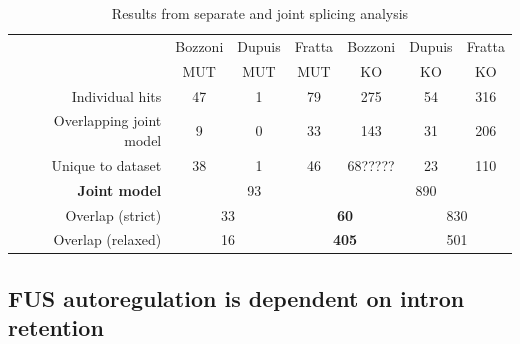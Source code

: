 \begingroup
\renewcommand{\arraystretch}{1.5} 
\begin{table}[h!]
		\begin{tabular}{|r|ccc|ccc|}
			\hline
			& Bozzoni & Dupuis & Fratta & Bozzoni & Dupuis & Fratta\\[-0.3cm]
			& MUT & MUT & MUT & KO & KO & KO\\
			\hline
			Individual hits                & 47 & 1 & 79 & 275 & 54 & 316 \\
			Overlapping joint model & 9 & 0 & 33 & 143 & 31 & 206 \\
			Unique to dataset          & 38 & 1 & 46 & 68????? & 23 & 110 \\
			\hline
			\textbf{Joint model}       & \multicolumn{3}{c|}{93} & \multicolumn{3}{c|}{890} \\
			\hline
			Overlap (strict)              & \multicolumn{2}{c|}{33} & \multicolumn{2}{c|}{\textbf{60}} & \multicolumn{2}{c|}{830} \\
			Overlap (relaxed)           & \multicolumn{2}{c|}{16} & \multicolumn{2}{c|}{\textbf{405} } & \multicolumn{2}{c|}{501} \\
			\hline
		\end{tabular}
	\caption{Results from separate and joint splicing analysis}
	\label{tab:splicing_results}
\end{table}
\endgroup

\subsection{FUS autoregulation is dependent on intron retention}

